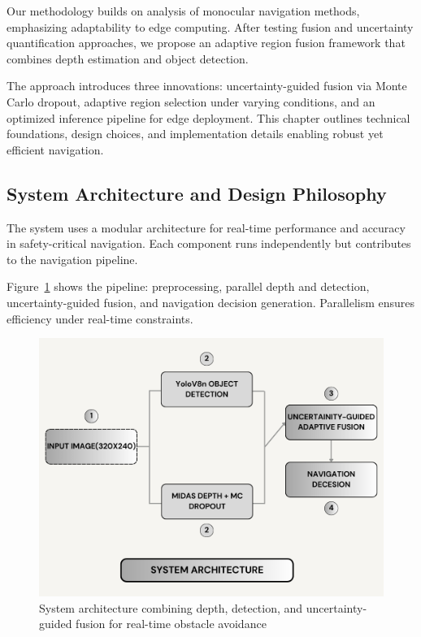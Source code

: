 \documentclass[12pt,oneside]{book}
\newcommand{\figref}[1]{Figure~\ref{#1}}
\begin{document}
Our methodology builds on analysis of monocular navigation methods, emphasizing adaptability to edge computing. After testing fusion and uncertainty quantification approaches, we propose an adaptive region fusion framework that combines depth estimation and object detection.

The approach introduces three innovations: uncertainty-guided fusion via Monte Carlo dropout, adaptive region selection under varying conditions, and an optimized inference pipeline for edge deployment. This chapter outlines technical foundations, design choices, and implementation details enabling robust yet efficient navigation.

\subsection{System Architecture and Design Philosophy}

The system uses a modular architecture for real-time performance and accuracy in safety-critical navigation. Each component runs independently but contributes to the navigation pipeline.

\figref{fig:architecture} shows the pipeline: preprocessing, parallel depth and detection, uncertainty-guided fusion, and navigation decision generation. Parallelism ensures efficiency under real-time constraints.

\begin{figure}[p]
\centering
\includegraphics[width=1\textwidth,height=0.85\textheight,keepaspectratio]{system_architecture.png}
\vspace{1cm}
\caption{System architecture combining depth, detection, and uncertainty-guided fusion for real-time obstacle avoidance}
\label{fig:architecture}
\end{figure}
\end{document}
